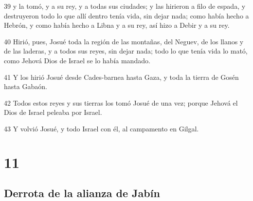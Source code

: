 \par 39 y la tomó, y a su rey, y a todas sus ciudades; y las hirieron a filo de espada, y destruyeron todo lo que allí dentro tenía vida, sin dejar nada; como había hecho a Hebrón, y como había hecho a Libna y a su rey, así hizo a Debir y a su rey.
\par 40 Hirió, pues, Josué toda la región de las montañas, del Neguev, de los llanos y de las laderas, y a todos sus reyes, sin dejar nada; todo lo que tenía vida lo mató, como Jehová Dios de Israel se lo había mandado.
\par 41 Y los hirió Josué desde Cades-barnea hasta Gaza, y toda la tierra de Gosén hasta Gabaón.
\par 42 Todos estos reyes y sus tierras los tomó Josué de una vez; porque Jehová el Dios de Israel peleaba por Israel.
\par 43 Y volvió Josué, y todo Israel con él, al campamento en Gilgal.

\chapter{11}

\section*{Derrota de la alianza de Jabín}

